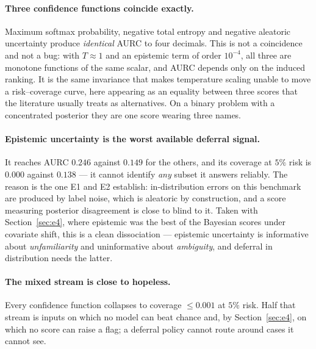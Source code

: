 \documentclass{article}
\begin{document}
\paragraph{Three confidence functions coincide exactly.} Maximum softmax
probability, negative total entropy and negative aleatoric uncertainty produce
\emph{identical} AURC to four decimals. This is not a coincidence and not a bug:
with $T \approx 1$ and an epistemic term of order $10^{-4}$, all three are
monotone functions of the same scalar, and AURC depends only on the induced
ranking. It is the same invariance that makes temperature scaling unable to move
a risk--coverage curve, here appearing as an equality between three scores that
the literature usually treats as alternatives. On a binary problem with a
concentrated posterior they are one score wearing three names.

\paragraph{Epistemic uncertainty is the worst available deferral signal.} It
reaches AURC $0.246$ against $0.149$ for the others, and its coverage at $5\%$
risk is $0.000$ against $0.138$ --- it cannot identify \emph{any} subset it
answers reliably. The reason is the one E1 and E2 establish: in-distribution
errors on this benchmark are produced by label noise, which is aleatoric by
construction, and a score measuring posterior disagreement is close to blind to
it. Taken with Section~\ref{sec:e4}, where epistemic was the best of the
Bayesian scores under covariate shift, this is a clean dissociation ---
epistemic uncertainty is informative about \emph{unfamiliarity} and
uninformative about \emph{ambiguity}, and deferral in distribution needs the
latter.

\paragraph{The mixed stream is close to hopeless.} Every confidence function
collapses to coverage $\le 0.001$ at $5\%$ risk. Half that stream is inputs on
which no model can beat chance and, by Section~\ref{sec:e4}, on which no score
can raise a flag; a deferral policy cannot route around cases it cannot see.
\end{document}
